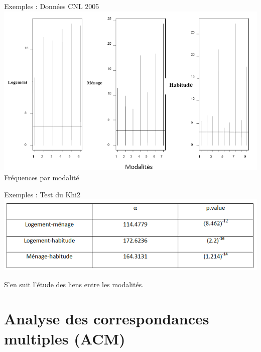 \documentclass[11pt]{beamer}
\begin{document}
\begin{frame}{Exemples : Données CNL 2005}
\includegraphics[scale=.5]{CNL8} 
Fréquences par modalité 
\end{frame}



\begin{frame}{Exemples : Test du Khi2}
\includegraphics[scale=.45]{CNL9} 



S'en suit l'étude des liens entre les modalités.
\end{frame}

\section{Analyse des correspondances multiples (ACM)}
\end{document}
